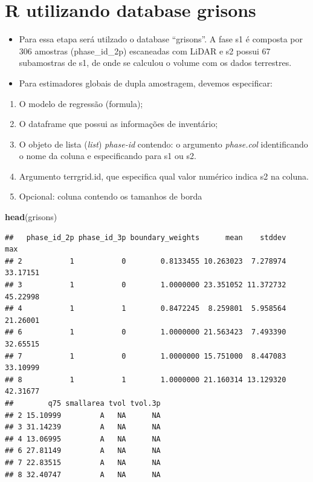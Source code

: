 \documentclass[
]{article}
\newenvironment{Shaded}{\begin{snugshade}}{\end{snugshade}}
\newcommand{\FunctionTok}[1]{\textcolor[rgb]{0.13,0.29,0.53}{\textbf{#1}}}
\newcommand{\NormalTok}[1]{#1}
\providecommand{\tightlist}{%
  \setlength{\itemsep}{0pt}\setlength{\parskip}{0pt}}
\begin{document}
\section{R utilizando database
grisons}\label{r-utilizando-database-grisons}

\begin{itemize}
\tightlist
\item
  Para essa etapa será utilzado o database ``grisons''. A fase s1 é
  composta por 306 amostras (phase\_id\_2p) escaneadas com LiDAR e s2
  possui 67 subamostras de s1, de onde se calculou o volume com os dados
  terrestres.
\item
  Para estimadores globais de dupla amostragem, devemos especificar:\\
\end{itemize}

\begin{enumerate}
\def\labelenumi{\arabic{enumi}.}
\tightlist
\item
  O modelo de regressão (formula);
\item
  O dataframe que possui as informações de inventário;
\item
  O objeto de lista (\emph{list}) \emph{phase-id} contendo: o argumento
  \emph{phase.col} identificando o nome da coluna e especificando para
  s1 ou s2.
\item
  Argumento terrgrid.id, que especifica qual valor numérico indica s2 na
  coluna.
\item
  Opcional: coluna contendo os tamanhos de borda
\end{enumerate}

\begin{Shaded}
\begin{Highlighting}[]
\FunctionTok{head}\NormalTok{(grisons)}
\end{Highlighting}
\end{Shaded}

\begin{verbatim}
##   phase_id_2p phase_id_3p boundary_weights      mean    stddev      max
## 2           1           0        0.8133455 10.263023  7.278974 33.17151
## 3           1           0        1.0000000 23.351052 11.372732 45.22998
## 4           1           1        0.8472245  8.259801  5.958564 21.26001
## 6           1           0        1.0000000 21.563423  7.493390 32.65515
## 7           1           0        1.0000000 15.751000  8.447083 33.10999
## 8           1           1        1.0000000 21.160314 13.129320 42.31677
##        q75 smallarea tvol tvol.3p
## 2 15.10999         A   NA      NA
## 3 31.14239         A   NA      NA
## 4 13.06995         A   NA      NA
## 6 27.81149         A   NA      NA
## 7 22.83515         A   NA      NA
## 8 32.40747         A   NA      NA
\end{verbatim}
\end{document}
